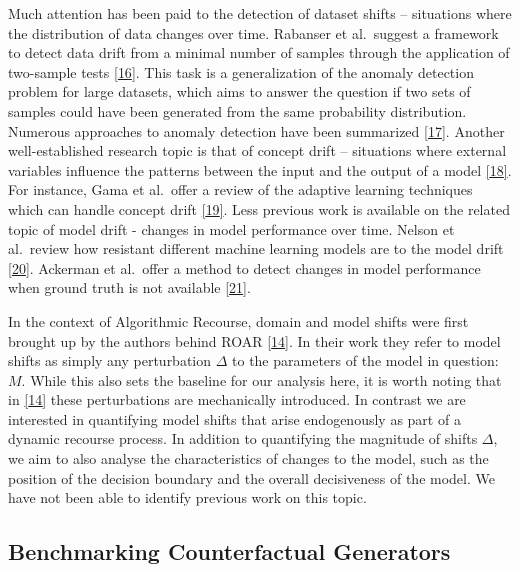 \documentclass[conference,final,]{IEEEtran}
\begin{document}
Much attention has been paid to the detection of dataset shifts -- situations where the distribution of data changes over time. Rabanser et al.~suggest a framework to detect data drift from a minimal number of samples through the application of two-sample tests \protect\hyperlink{ref-rabanser2019failing}{{[}16{]}}. This task is a generalization of the anomaly detection problem for large datasets, which aims to answer the question if two sets of samples could have been generated from the same probability distribution. Numerous approaches to anomaly detection have been summarized \protect\hyperlink{ref-chandola2009anomaly}{{[}17{]}}. Another well-established research topic is that of concept drift -- situations where external variables influence the patterns between the input and the output of a model \protect\hyperlink{ref-widmer1996learning}{{[}18{]}}. For instance, Gama et al.~offer a review of the adaptive learning techniques which can handle concept drift \protect\hyperlink{ref-gama2014survey}{{[}19{]}}. Less previous work is available on the related topic of model drift - changes in model performance over time. Nelson et al.~review how resistant different machine learning models are to the model drift \protect\hyperlink{ref-nelson2015evaluating}{{[}20{]}}. Ackerman et al.~offer a method to detect changes in model performance when ground truth is not available \protect\hyperlink{ref-ackerman2021machine}{{[}21{]}}.

In the context of Algorithmic Recourse, domain and model shifts were first brought up by the authors behind ROAR \protect\hyperlink{ref-upadhyay2021towards}{{[}14{]}}. In their work they refer to model shifts as simply any perturbation \(\Delta\) to the parameters of the model in question: \(M\). While this also sets the baseline for our analysis here, it is worth noting that in \protect\hyperlink{ref-upadhyay2021towards}{{[}14{]}} these perturbations are mechanically introduced. In contrast we are interested in quantifying model shifts that arise endogenously as part of a dynamic recourse process. In addition to quantifying the magnitude of shifts \(\Delta\), we aim to also analyse the characteristics of changes to the model, such as the position of the decision boundary and the overall decisiveness of the model. We have not been able to identify previous work on this topic.

\hypertarget{related-benchmark}{%
\subsection{Benchmarking Counterfactual Generators}\label{related-benchmark}}
\end{document}
